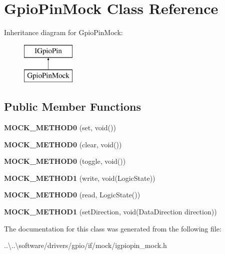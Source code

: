 \hypertarget{class_gpio_pin_mock}{}\section{Gpio\+Pin\+Mock Class Reference}
\label{class_gpio_pin_mock}
Inheritance diagram for Gpio\+Pin\+Mock\+:\begin{figure}[H]
\begin{center}
\leavevmode
\includegraphics[height=2.000000cm]{class_gpio_pin_mock}
\end{center}
\end{figure}
\subsection*{Public Member Functions}
\begin{DoxyCompactItemize}
\item 
\mbox{\label{class_gpio_pin_mock_a56f146c2b2a2bae6fd4cefb9d152b713}} 
{\bfseries M\+O\+C\+K\+\_\+\+M\+E\+T\+H\+O\+D0} (set, void())
\item 
\mbox{\label{class_gpio_pin_mock_aa8fbc0b168892c31b9f2fa8f7b441fb8}} 
{\bfseries M\+O\+C\+K\+\_\+\+M\+E\+T\+H\+O\+D0} (clear, void())
\item 
\mbox{\label{class_gpio_pin_mock_a360e0ac070c5fc973837f202d09231b8}} 
{\bfseries M\+O\+C\+K\+\_\+\+M\+E\+T\+H\+O\+D0} (toggle, void())
\item 
\mbox{\label{class_gpio_pin_mock_a70637e5cff06f90e89abf1bea0af5f1b}} 
{\bfseries M\+O\+C\+K\+\_\+\+M\+E\+T\+H\+O\+D1} (write, void(Logic\+State))
\item 
\mbox{\label{class_gpio_pin_mock_a782457feb32b410b8bf159adf6f51527}} 
{\bfseries M\+O\+C\+K\+\_\+\+M\+E\+T\+H\+O\+D0} (read, Logic\+State())
\item 
\mbox{\label{class_gpio_pin_mock_ae9c2e1480c656283b64271eb6aca67a7}} 
{\bfseries M\+O\+C\+K\+\_\+\+M\+E\+T\+H\+O\+D1} (set\+Direction, void(Data\+Direction direction))
\end{DoxyCompactItemize}


The documentation for this class was generated from the following file\+:\begin{DoxyCompactItemize}
\item 
..\textbackslash{}..\textbackslash{}software/drivers/gpio/if/mock/igpiopin\+\_\+mock.\+h\end{DoxyCompactItemize}
